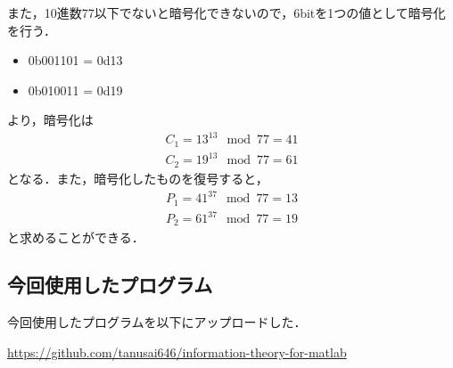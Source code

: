 \documentclass[documentclass]{jsarticle}
\begin{document}
また，10進数77以下でないと暗号化できないので，6bitを1つの値として暗号化を行う．
\begin{itemize}
  \item 0b001101 = 0d13
  \item 0b010011 = 0d19
\end{itemize}
より，暗号化は
\begin{align}
  C_1 = 13^{13} \mod 77 = 41\\
  C_2 = 19^{13} \mod 77 = 61
\end{align}
となる．また，暗号化したものを復号すると，
\begin{align}
  P_1 = 41^{37} \mod 77 = 13\\
  P_2 = 61^{37} \mod 77 = 19
\end{align}
と求めることができる．

\newpage

\subsection*{今回使用したプログラム}
今回使用したプログラムを以下にアップロードした．

\url{https://github.com/tanusai646/information-theory-for-matlab}
\end{document}
